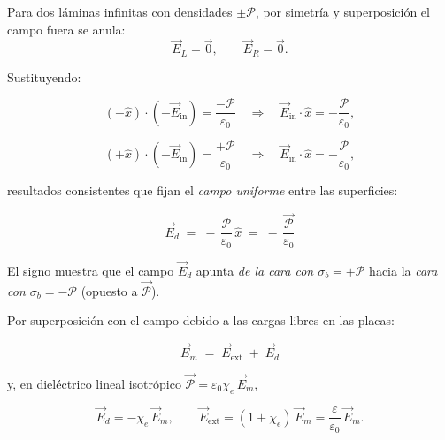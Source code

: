 \documentclass{article}
\begin{document}
Para dos láminas infinitas con densidades \(\pm \mathcal P\), por simetría y superposición
el campo fuera se anula:
\begin{equation}
\vec{E}_{L}=\vec{0},\qquad \vec{E}_{R}=\vec{0}.
\end{equation}

Sustituyendo:

\begin{equation}
(-\hat{x})\cdot( -\vec{E}_{\text{in}} )=\frac{-\mathcal P}{\varepsilon_0}
\quad\Rightarrow\quad
\vec{E}_{\text{in}}\cdot\hat{x}=-\frac{\mathcal P}{\varepsilon_0},
\end{equation}

\begin{equation}
(+\hat{x})\cdot( -\vec{E}_{\text{in}} )=\frac{+\mathcal P}{\varepsilon_0}
\quad\Rightarrow\quad
\vec{E}_{\text{in}}\cdot\hat{x}=-\frac{\mathcal P}{\varepsilon_0},
\end{equation}

resultados consistentes que fijan el \emph{campo uniforme} entre las superficies:

\begin{equation}
\boxed{\, \vec{E}_{d} \;=\; -\,\frac{\mathcal P}{\varepsilon_0}\,\hat{x} \;=\; -\,\frac{\vec{\mathcal P}}{\varepsilon_0} \,}
\end{equation}

El signo muestra que el campo \(\vec{E}_{d}\) apunta \emph{de la cara con \(\sigma_b=+\mathcal P\)}
hacia la \emph{cara con \(\sigma_b=-\mathcal P\)} (opuesto a \(\vec{\mathcal P}\)).

Por superposición con el campo debido a las cargas libres en las placas:

\begin{equation}
\boxed{\, \vec{E}_{m} \;=\; \vec{E}_{\text{ext}} \;+\; \vec{E}_{d} \,}
\end{equation}

y, en dieléctrico lineal isotrópico \(\vec{\mathcal P}=\varepsilon_0\chi_e\,\vec{E}_{m}\),

\begin{equation}
\vec{E}_{d}=-\chi_e\,\vec{E}_{m}, 
\qquad
\vec{E}_{\text{ext}}=(1+\chi_e)\,\vec{E}_{m}=\frac{\varepsilon}{\varepsilon_0}\,\vec{E}_{m}.
\end{equation}
	
\end{document}
